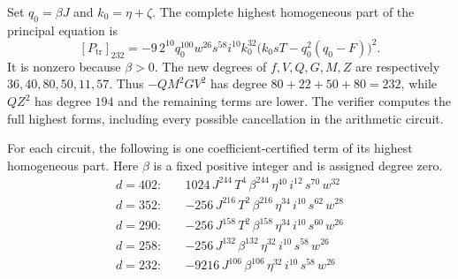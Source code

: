 Set $q_0=\beta J$ and $k_0=\eta+\zeta$. The complete highest homogeneous part
of the principal equation is
\[
[P_{\mathrm{tr}}]_{232}
=-9\,2^{10}q_0^{100}w^{26}s^{58}i^{10}k_0^{32}
\bigl(k_0sT-q_0^2(q_0-F)\bigr)^2.
\]
It is nonzero because $\beta>0$. The new degrees of $f,V,Q,G,M,Z$
are respectively $36,40,80,50,11,57$. Thus $-QM^2GV^2$ has degree
$80+22+50+80=232$, while $QZ^2$ has degree $194$ and the remaining
terms are lower. The verifier computes the full highest forms, including
every possible cancellation in the arithmetic circuit.

For each circuit, the following is one coefficient-certified term of
its highest homogeneous part. Here $\beta$ is a fixed positive integer
and is assigned degree zero.
\begin{align*}
d=402:\quad & 1024\,J^{244}\,T^{4}\,\beta^{244}\,\eta^{40}\,i^{12}\,s^{70}\,w^{32}\\
d=352:\quad & -256\,J^{216}\,T^{2}\,\beta^{216}\,\eta^{34}\,i^{10}\,s^{62}\,w^{28}\\
d=290:\quad & -256\,J^{158}\,T^{2}\,\beta^{158}\,\eta^{34}\,i^{10}\,s^{60}\,w^{26}\\
d=258:\quad & -256\,J^{132}\,\beta^{132}\,\eta^{32}\,i^{10}\,s^{58}\,w^{26}\\
d=232:\quad & -9216\,J^{106}\,\beta^{106}\,\eta^{32}\,i^{10}\,s^{58}\,w^{26}
\end{align*}
